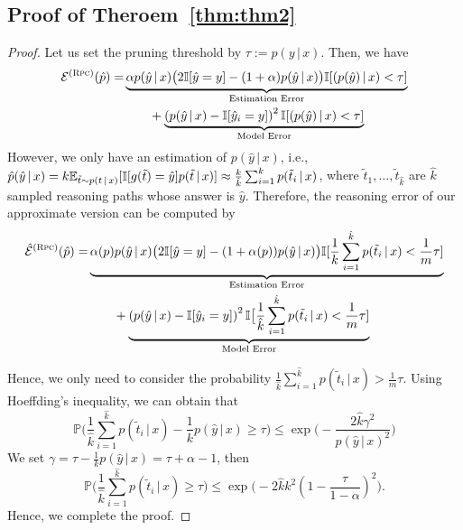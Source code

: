 \subsection{Proof of Theroem~\ref{thm:thm2}} \label{app:thm2}
\begin{proof}
Let us set the pruning threshold by $\tau := p(y \,|\, x)$. Then, we have
\begin{equation*}
    \begin{aligned}
      \mathcal{E}^{(\textsc{Rpc})}(\hat{p}) 
      = & \underbrace{ \alpha p(\hat{y} \,|\, x) \big(2\mathbb{I}[\hat{y}=y] - (1 + \alpha) p(\hat{y} \,|\, x) \big) \mathbb{I}[(p(\hat{y}) \,|\, x) < \tau]}_{\text{Estimation Error}} \\
        & \qquad + \underbrace{\left( p(\hat{y} \,|\, x) - \mathbb{I}[\hat{y}_i = y] \right )^2  \mathbb{I}[(p(\hat{y}) \,|\, x) < \tau]}_{\text{Model Error}} \\
    \end{aligned}
\end{equation*}
However, we only have an estimation of $p(\hat{y} \,|\, x)$, i.e., $\hat{p}(\hat{y} \,|\, x) = k \mathbb{E}_{\tilde{t} \sim p(t \,|\, x)} [\mathbb{I}[g(\tilde{t}) = \hat{y}] p(\tilde{t} \,|\, x)] \approx \frac{k}{\hat{k}} \sum_{i=1}^k p(\tilde{t}_i \,|\, x)$, where $\tilde{t}_1, \dots, \tilde{t}_{\hat{k}}$ are $\hat{k}$ sampled reasoning paths whose answer is $\hat{y}$.
Therefore, the reasoning error of our approximate version can be computed by
\begin{equation*}
    \begin{aligned}
      \hat{\mathcal{E}}^{(\RPC)}(\hat{p}) 
      = & \underbrace{ \alpha(p) p(\hat{y} \,|\, x) \big(2\I[\hat{y}=y] - (1 + \alpha(p)) p(\hat{y} \,|\, x) \big) \I[\frac{1}{k} \sum_{i=1}^{\hat{k}} p(\tilde{t}_i \,|\, x) < \frac{1}{m}\tau]}_{\text{Estimation Error}} \\
        & \qquad + \underbrace{\left( p(\hat{y} \,|\, x) - \I[\hat{y}_i = y] \right )^2  \I\big[\frac{1}{\hat{k}} \sum_{i=1}^{\hat{k}} p(\tilde{t}_i \,|\, x) < \frac{1}{m}\tau\bigskip
        ]}_{\text{Model Error}} \\
    \end{aligned}
\end{equation*}

Hence, we only need to consider the probability $\frac{1}{\hat{k}} \sum_{i=1}^{\hat{k}} p(\tilde{t}_i \,|\, x) > \frac{1}{m} \tau$.
Using Hoeffding's inequality, we can obtain that
\begin{equation*}
\mathbb{P}\big(\frac{1}{\hat{k}} \sum_{i=1}^{\hat{k}} p(\tilde{t}_i \,|\, x) - \frac{1}{k} p(\hat{y} \,|\, x) \ge \tau \big)  \leq \exp\Big(-\frac{2\hat{k}\gamma^2}{ p(\hat{y} \,|\, x)^2}\Big)
\end{equation*}
We set $\gamma = \tau - \frac{1}{k} p(\hat{y} \,|\, x) = \tau + \alpha - 1$, then 
\begin{equation*}
\mathbb{P}\big(\frac{1}{\hat{k}} \sum_{i=1}^{\hat{k}} p(\tilde{t}_i \,|\, x) \ge \tau \big)  \leq \exp\Big(-{2\hat{k}k^2} (1 - \frac{\tau}{1 - \alpha})^2\Big).
\end{equation*}
Hence, we complete the proof.
\end{proof}


